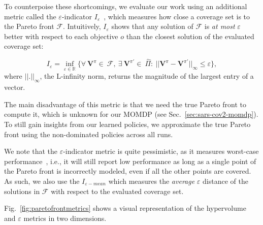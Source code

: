 \documentclass{article}
\renewcommand{\cite}[1]{\citep{#1}}
\newcommand{\momdpvaluefunction}{\mathbf{V}}
\begin{document}
To counterpoise these shortcomings, we evaluate our work using an additional metric called the $\varepsilon$-indicator $I_\varepsilon$~\cite{zitzler2003}, which measures how close a coverage set is to the Pareto front $\mathcal{F}$. Intuitively, $I_\varepsilon$ shows that any solution of $\mathcal{F}$ is \emph{at most} $\varepsilon$ better with respect to each objective $o$ than the closest solution of the evaluated coverage set:

\begin{equation}
\label{eq:epsilon-metric}
    I_{\varepsilon} = 
    \inf_{\varepsilon\in\mathbb{R}} 
    \{ 
    \forall\ \momdpvaluefunction^\pi\!{\in}\ \mathcal{F}, ~
    \exists\ \momdpvaluefunction^{\pi'}\!{\in}\ \hat{\Pi} :\ 
    || \momdpvaluefunction^\pi - \momdpvaluefunction^{\pi'} ||_{\infty} \le \varepsilon
    \},
\end{equation}
%
where $||.||_{\infty}$, the L-infinity norm, returns the magnitude of the largest entry of a vector.

The main disadvantage of this metric is that we need the true Pareto front to compute it, which is unknown for our MOMDP (see Sec.~\ref{sec:sars-cov2-momdp}). To still gain insights from our learned policies, we approximate the true Pareto front using the non-dominated policies across all runs.

We note that the $\varepsilon$-indicator metric is quite pessimistic, as it measures worst-case performance~\cite{zintgraf2015}, i.e., it will still report low performance as long as a single point of the Pareto front is incorrectly modeled, even if all the other points are covered. As such, we also use the $I_{\varepsilon-mean}$ \cite{reymond2022pcn} which measures the \emph{average} $\varepsilon$ distance of the solutions in $\mathcal{F}$ with respect to the evaluated coverage set.

Fig.~\ref{fig:paretofrontmetrics} shows a visual representation of the hypervolume and $\varepsilon$ metrics in two dimensions.
\end{document}
